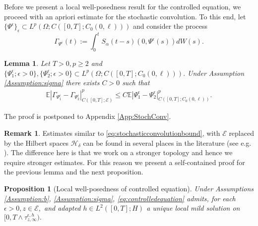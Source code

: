 \documentclass[10pt, reqno]{amsart}
\newcommand{\ex}{\mathbb{E}}
\newcommand{\h}{\mathcal{H}}
\newcommand{\e}{\mathcal{E}}
\newtheorem{lem}{Lemma}
\newtheorem{prop}{Proposition}
\theoremstyle{definition}
\newtheorem{rem}{Remark}
\numberwithin{lem}{section}
\numberwithin{cor}{section}
\numberwithin{prop}{section}
\numberwithin{thm}{section}
\numberwithin{dfn}{section}
\begin{document}
 Before we present a local well-posedness result for the controlled equation, we proceed with an apriori estimate for the stochastic convolution. To this end, let $\{\Psi^\epsilon\}_{\epsilon}\subset L^p(\Omega;     C([0,T];C_0(0,\ell)))$ and consider the process
\begin{equation*}\label{eq:StochasticConvolutionDfn}
     \Gamma_{\Psi^\epsilon}(t):=\int_0^tS_{\alpha}(t-s)(0,\Psi^\epsilon(s))dW(s).
 \end{equation*} 
\begin{lem}\label{lem:StochasticConvolutionApriori} Let $T>0, p\geq 2$ and $\{\Psi_1^\epsilon;\epsilon>0\}, \{\Psi_2^\epsilon;\epsilon>0\}\subset L^p(\Omega; C([0,T];C_0(0,\ell))).$ Under Assumption \ref{Assumption:sigma} there exists $C>0$ such that  \begin{equation}\label{eq:stochasticconvolutionbound}
     \begin{aligned}
        \ex| \Gamma_{\Psi_1^\epsilon}-\Gamma_{\Psi_2^\epsilon}|_{C([0,T];\e)}^p\leq C\ex|\Psi_1^\epsilon-\Psi_2^\epsilon|^p_{ C([0,T];C_0(0,\ell))}.
     \end{aligned}
 \end{equation}
 \end{lem}
 \noindent The proof is postponed to Appendix \ref{App:StochConv}.

 \begin{rem} Estimates similar to \eqref{eq:stochasticconvolutionbound}, with $\e$ replaced by the Hilbert spaces $\h_\delta$  can be found in several places in the literature (see e.g. \cite[proof of Theorem 4.2]{cerrai2006smoluchowski}). The difference here is that we work on a stronger topology and hence we require stronger estimates. For this reason we present a self-contained proof for the previous lemma and the next proposition.
     
 \end{rem}
 \begin{prop}[Local well-posedness of controlled equation] \label{prop:WellPosedness} Under Assumptions \ref{Assumption:b}, \ref{Assumption:sigma},  \eqref{eq:controlledequation} admits, for each $\epsilon>0, z\in\e,$ and adapted $ h\in L^2([0,T];H)$ a unique local mild solution on $[0,T \wedge \tau^{\epsilon, h}_{z,\infty}).$ 
 \end{prop}
\end{document}

